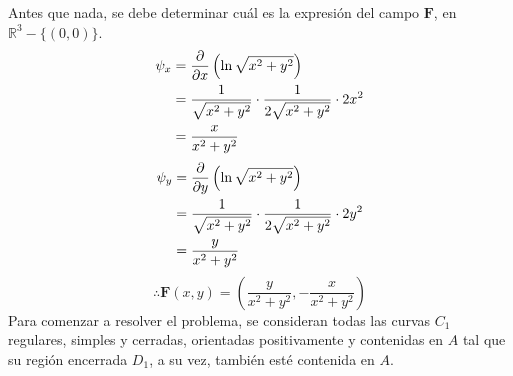 \newpage
\begin{solution}

    Antes que nada, se debe determinar cuál es la expresión del campo $\mathbf{F}$, en $\mathbb{R}^3-\{(0,0)\}$.
    \begin{align*}
        \psi_x&=\frac{\partial}{\partial x}\left(\ln{\sqrt{x^2+y^2}}\right)\\
        &=\frac{1}{\sqrt{x^2+y^2}} \cdot \frac{1}{2\sqrt{x^2+y^2}} \cdot 2x^2\\
        &=\frac{x}{x^2+y^2}
    \end{align*}
    \begin{align*}
        \psi_y&=\frac{\partial}{\partial y}\left(\ln{\sqrt{x^2+y^2}}\right)\\
        &=\frac{1}{\sqrt{x^2+y^2}} \cdot \frac{1}{2\sqrt{x^2+y^2}} \cdot 2y^2\\
        &=\frac{y}{x^2+y^2}
    \end{align*}
    \begin{equation*}
        \therefore \mathbf{F}(x,y)= \left(\frac{y}{x^2+y^2}, -\frac{x}{x^2+y^2}\right)
    \end{equation*}
    Para comenzar a resolver el problema, se consideran todas las curvas $C_1$ regulares, simples y cerradas, orientadas positivamente
    y contenidas en $A$ tal que su región encerrada $D_1$, a su vez, también esté contenida en $A$. 
    \begin{center}
\end{center}
\end{solution}
